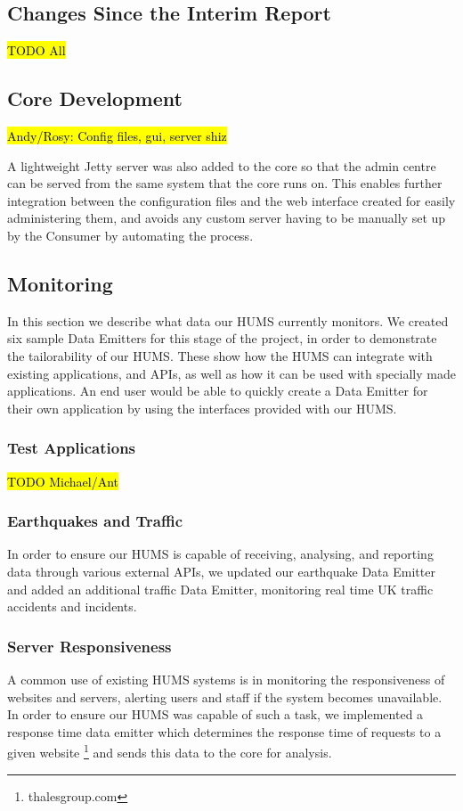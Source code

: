 \documentclass[10pt,a4paper]{article}
\begin{document}
\subsection{Changes Since the Interim Report}
\label{sec:changes}
\hl{TODO All}

\subsection{Core Development}
\label{sec:core}
\hl{Andy/Rosy: Config files, gui, server shiz}

A lightweight Jetty server was also added to the core so that the admin centre can be served from the same system that the core runs on. This enables further integration between the configuration files and the web interface created for easily administering them, and avoids any custom server having to be manually set up by the Consumer by automating the process.

\subsection{Monitoring}
\label{sec:monitor}
In this section we describe what data our HUMS currently monitors. We created six sample Data Emitters for this stage of the project, in order to demonstrate the tailorability of our HUMS. These show how the HUMS can integrate with existing applications, and APIs, as well as how it can be used with specially made applications. An end user would be able to quickly create a Data Emitter for their own application by using the interfaces provided with our HUMS.

\subsubsection{Test Applications}
\hl{TODO Michael/Ant}

\subsubsection{Earthquakes and Traffic}
In order to ensure our HUMS is capable of receiving, analysing, and reporting data through various external APIs, we updated our earthquake Data Emitter and added an additional traffic Data Emitter, monitoring real time UK traffic accidents and incidents.

\subsubsection{Server Responsiveness}
A common use of existing HUMS systems is in monitoring the responsiveness of websites and servers, alerting users and staff if the system becomes unavailable. In order to ensure our HUMS was capable of such a task, we implemented a response time data emitter which determines the response time of requests to a given website \footnote{thalesgroup.com} and sends this data to the core for analysis.
\end{document}
